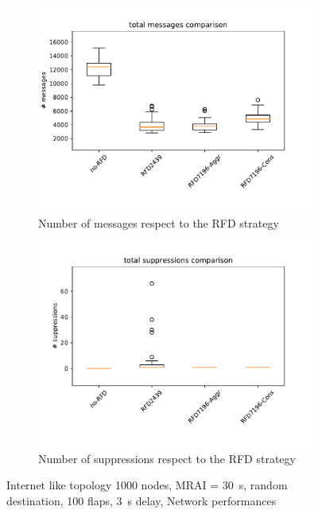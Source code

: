\begin{figure}[h]
\begin{subfigure}[b]{0.325\textwidth}
         \includegraphics[width=\textwidth]{images/RFD/miceVSelephants/elephants/cisco_1000MRAI30_rfd_comparison_messages_boxplot.pdf}
         \caption{Number of messages respect to the RFD strategy}
         \label{fig:1000_RFD_MRAI30_messages_elephant}
     \end{subfigure}
     \hfill
     \begin{subfigure}[b]{0.325\textwidth}
         \centering
         \includegraphics[width=\textwidth]{images/RFD/miceVSelephants/elephants/cisco_1000MRAI30_rfd_comparison_suppressions_boxplot.pdf}
         \caption{Number of suppressions respect to the RFD strategy}
         \label{fig:1000_RFD_MRAI30_suppressions_elephant}
     \end{subfigure}
		\caption{Internet like topology \num{1000} nodes, \ac{MRAI} = \SI{30}{\second}, random destination, \num{100} flaps, \SI{3}{\second} delay, Network performances}
        \label{fig:1000_RFD_MRAI30_elephant}
\end{figure}

